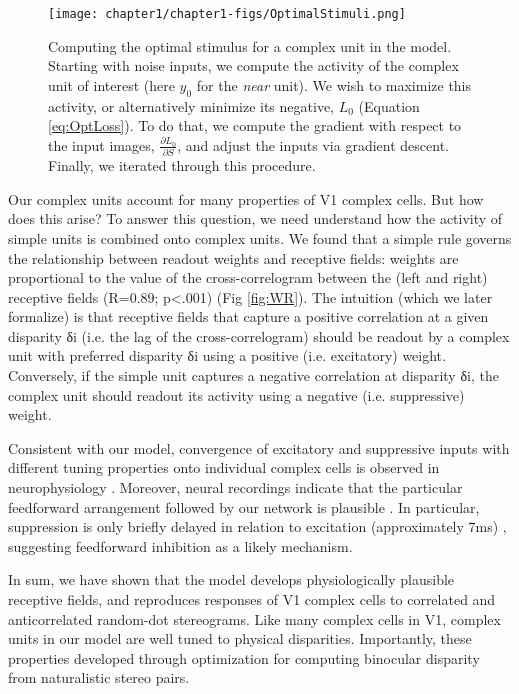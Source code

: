 \begin{figure}[!h]
  \centering
  \texttt{[image: chapter1/chapter1-figs/OptimalStimuli.png]}
  \caption[Computing the optimal stimulus for a complex unit in the model.]{Computing the optimal stimulus for a complex unit in the model. Starting with noise inputs, we compute the activity of the complex unit of interest (here $y_0$ for the \textit{near} unit). We wish to maximize this activity, or alternatively minimize its negative, $L_0$ (Equation \ref{eq:OptLoss}). To do that, we compute the gradient with respect to the input images, $\frac{\partial L_0}{\partial S}$, and adjust the inputs via gradient descent. Finally, we iterated through this procedure.}
  \label{fig:OptStim}
\end{figure}

Our complex units account for many properties of V1 complex cells. But how does this arise? To answer this question, we need understand how the activity of simple units is combined onto complex units. We found that a simple rule governs the relationship between readout weights and receptive fields: weights are proportional to the value of the cross-correlogram between the (left and right) receptive fields (R=0.89; p<.001) (Fig \ref{fig:WR}). The intuition (which we later formalize) is that receptive fields that capture a positive correlation at a given disparity δi (i.e. the lag of the cross-correlogram) should be readout by a complex unit with preferred disparity δi using a positive (i.e. excitatory) weight. Conversely, if the simple unit captures a negative correlation at disparity δi, the complex unit should readout its activity using a negative (i.e. suppressive) weight. 



Consistent with our model, convergence of excitatory and suppressive inputs with different tuning properties onto individual complex cells is observed in neurophysiology \cite{Tanabe:2011pt}. Moreover, neural recordings indicate that the particular feedforward arrangement followed by our network is plausible \cite{Tanabe:2014ud}. In particular, suppression is only briefly delayed in relation to excitation (approximately 7ms) \cite{Tanabe:2014ud}, suggesting feedforward inhibition as a likely mechanism.

In sum, we have shown that the model develops physiologically plausible receptive fields, and reproduces responses of V1 complex cells to correlated and anticorrelated random-dot stereograms. Like many complex cells in V1, complex units in our model are well tuned to physical disparities. Importantly, these properties developed through optimization for computing binocular disparity from naturalistic stereo pairs. 

